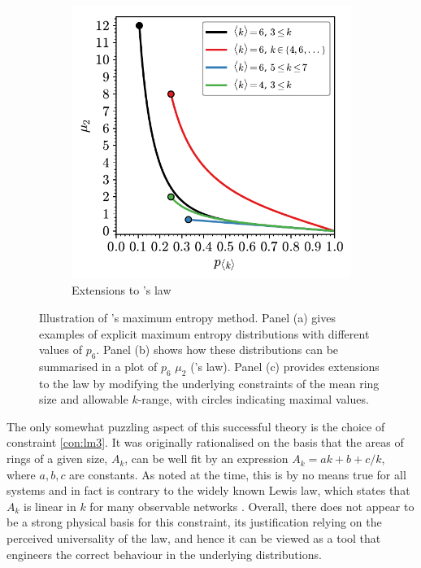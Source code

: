 \begin{figure}[bt]
     \vspace{2mm}
      \begin{subfigure}[b]{0.45\textwidth}
         \centering
         \includegraphics[width=\textwidth]{./figures/methods/lm_3.pdf}
         \caption{Extensions to \lm's law}
         \label{fig:lm3}
     \end{subfigure}
     \hfill

    
     \caption{Illustration of \lm's maximum entropy method. Panel (a) gives examples of explicit maximum entropy distributions with different values of $p_6$. Panel (b) shows how these distributions can be summarised in a plot of $p_6$ \vs{} $\mu_2$ (\lm's law). Panel (c) provides extensions to the law by modifying the underlying constraints of the mean ring size and allowable $k$\--range, with circles indicating maximal values.}
     \label{fig:lm}
\end{figure}

The only somewhat puzzling aspect of this successful theory is the choice of constraint \eqref{con:lm3}.
It was originally rationalised on the basis that the areas of rings of a given size, $A_k$, can be well fit by an expression $A_k = ak+b+c/k$, where $a,b,c$ are constants.
As noted at the time, this is by no means true for all systems and in fact is contrary to the widely known Lewis law, which states that $A_k$ is linear in $k$ for many observable networks \cite{Lewis1928,Fortes1995,Kim2014}.
Overall, there does not appear to be a strong physical basis for this constraint, its justification relying on the perceived universality of the \lm{} law, and  hence it can be viewed as a tool that engineers the correct behaviour in the underlying distributions. 

